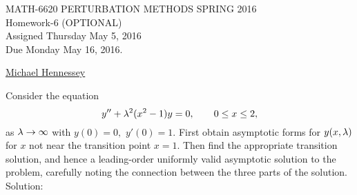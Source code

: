 

\newcommand{\Ai}{{\rm Ai}}
\newcommand{\Bi}{{\rm Bi}}
\pagestyle{empty}


\begin{center}
\large{ MATH-6620 \hspace{1in}  PERTURBATION METHODS \hspace{1in}SPRING 2016\\ Homework-6 (OPTIONAL) \\ Assigned Thursday May 5, 2016 \\ Due Monday May 16, 2016.}\end{center}

\bigskip
\n\ul{Michael Hennessey}


 \ec

\benum

\item Consider the equation
$$y''+\lambda^2(x^2-1)y=0,\qquad 0\le x\le 2,$$
as $\lambda \to \infty$ with $y(0)=0,$ $y'(0)=1.$  First obtain
asymptotic forms for $y(x,\lambda)$ for $x$ not near the transition
point $x=1.$  Then find the appropriate transition solution, and
hence a leading-order uniformly valid asymptotic solution to the
problem, carefully noting the connection between the three
parts of the solution.\\

Solution:\\

